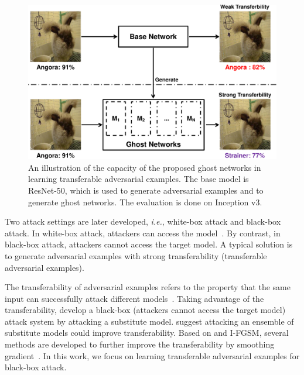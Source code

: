 \documentclass[letterpaper]{article} %
\def\ie{\emph{i.e.}}
\begin{document}
\begin{figure}[tb]
\begin{center}
\includegraphics[width=0.95\linewidth]{transferability-crop.pdf}
\end{center}
\caption{An illustration of the capacity of the proposed ghost networks in learning transferable adversarial examples. The base model is ResNet-50, which is used to generate adversarial examples and to generate ghost networks. The evaluation is done on Inception v3.}
\label{fig:ill_trans}
\end{figure}


Two attack settings are later developed, \ie, white-box attack and black-box attack.
In white-box attack, attackers can access the model~\cite{carlini2016towards,kurakin2016adversarial}.
By contrast, in black-box attack,
attackers cannot access the target model. A typical solution is to generate adversarial examples with strong transferability (transferable adversarial examples).

The transferability of adversarial examples refers to the property that the same input can successfully attack different models~\cite{szegedy2013intriguing}. Taking advantage of the transferability, \cite{papernot2016transferability} develop a black-box (attackers cannot access the target model) attack system by attacking a substitute model. \cite{liu2016delving} suggest attacking an ensemble of substitute models could improve transferability. Based on \cite{liu2016delving} and I-FGSM, several methods are developed to further improve the transferability by smoothing gradient~\cite{dong2017boosting,Zhou_2018_ECCV}. In this work, we focus on learning transferable adversarial examples for black-box attack.
\end{document}
